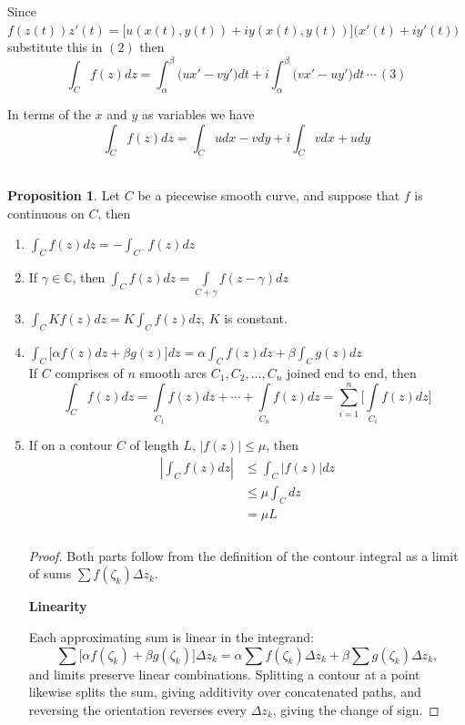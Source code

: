 \documentclass[11pt,a4paper]{article}
\theoremstyle{definition}
\newtheorem{proposition}[thm]{Proposition}
\newcommand{\subhead}[1]{%
  \par\medskip\noindent\textbf{#1}\par\nobreak\smallskip}
\begin{document}
Since $f(z(t))z'(t) = \big[u(x(t),y(t)) + iy(x(t),y(t))\big]\big(x'(t) + iy'(t)\big)$ substitute this in $(2)$ then
$$\int_Cf(z)dz = \int^{\beta}_{\alpha} \big(ux' - vy'\big)dt + i\int^{\beta}_{\alpha}\big(vx' - uy'\big)dt\,\cdots\, (3)$$

In terms of the $x$ and $y$ as variables we have
$$\int_C f(z)dz = \int_C udx - vdy + i \int_Cvdx  + udy$$\\



\begin{proposition}
Let $C$ be a piecewise smooth curve, and suppose that $f$ is continuous on $C$, then 
\begin{enumerate}
\item $\displaystyle{\int_Cf(z)dz = - \int_{C^-}f(z)dz}$

\item If $\gamma \in \mathbb{C}$, then $\displaystyle{\int_Cf(z)dz = \int\limits_{C + \gamma} f(z - \gamma)dz}$

\item $\displaystyle{\int_C Kf(z)dz = K\int_Cf(z)dz}, \,K$ is constant.

\item $\displaystyle{\int_C\big[\alpha f(z)dz + \beta g(z)\big]dz = \alpha\int_Cf(z)dz + \beta \int_Cg(z)dz}$\\

If $C$ comprises of $n$ smooth arcs $C_1,C_2, \ldots, C_n$ joined end to end, then 
$$\int_Cf(z)dz = \int\limits_{C_1} f(z)dz + \cdots + \int\limits_{C_n} f(z)dz = \sum^n_{i = 1} \Bigg[\int\limits_{C_i} f(z)dz\Bigg]$$

\item If on a contour $C$ of length $L, \,\left|f(z)\right|\leq \mu$, then 
\begin{align*}
\left|\int_Cf(z)dz\right| & \leq\int_C\left|f(z)\right|dz\\
& \leq \mu \int_Cdz\\
& = \mu L\\\\
\end{align*}

\begin{proof}
Both parts follow from the definition of the contour integral as a limit of
sums $\sum f(\zeta_k)\Delta z_k$.

\subhead{Linearity}
Each approximating sum is linear in the integrand:
$$\sum\big[\alpha f(\zeta_k)+\beta g(\zeta_k)\big]\Delta z_k
=\alpha\sum f(\zeta_k)\Delta z_k+\beta\sum g(\zeta_k)\Delta z_k ,$$
and limits preserve linear combinations. Splitting a contour at a point
likewise splits the sum, giving additivity over concatenated paths, and
reversing the orientation reverses every $\Delta z_k$, giving the change of
sign.


\end{proof}
\end{enumerate}
\end{proposition}
\end{document}
